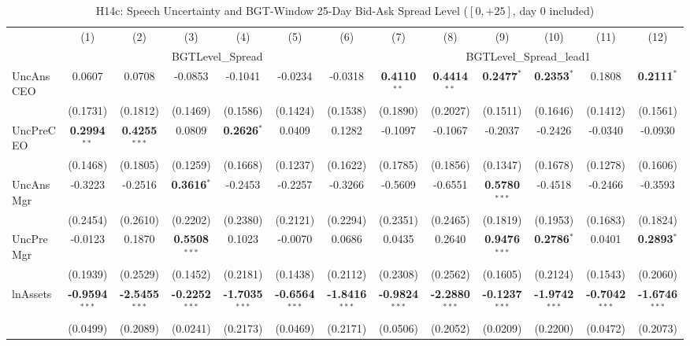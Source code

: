 \documentclass[11pt,a4paper]{article}
\begin{document}
\begin{table}[htbp]
\centering
\caption{H14c: Speech Uncertainty and BGT-Window 25-Day Bid-Ask Spread Level ($[0,+25]$, day 0 included)}
\label{tab:h14c}
\scriptsize
\begin{tabular}{lcccccccccccc}
\toprule
 & (1) & (2) & (3) & (4) & (5) & (6) & (7) & (8) & (9) & (10) & (11) & (12) \\
 & \multicolumn{6}{c}{BGTLevel\_Spread} & \multicolumn{6}{c}{BGTLevel\_Spread\_lead1} \\
\cmidrule(lr){2-7} \cmidrule(lr){8-13}
\midrule
UncAnsCEO & 0.0607 & 0.0708 & -0.0853 & -0.1041 & -0.0234 & -0.0318 & \textbf{0.4110}$^{**}$ & \textbf{0.4414}$^{**}$ & \textbf{0.2477}$^{*}$ & \textbf{0.2353}$^{*}$ & 0.1808 & \textbf{0.2111}$^{*}$ \\
 & (0.1731) & (0.1812) & (0.1469) & (0.1586) & (0.1424) & (0.1538) & (0.1890) & (0.2027) & (0.1511) & (0.1646) & (0.1412) & (0.1561) \\
UncPreCEO & \textbf{0.2994}$^{**}$ & \textbf{0.4255}$^{***}$ & 0.0809 & \textbf{0.2626}$^{*}$ & 0.0409 & 0.1282 & -0.1097 & -0.1067 & -0.2037 & -0.2426 & -0.0340 & -0.0930 \\
 & (0.1468) & (0.1805) & (0.1259) & (0.1668) & (0.1237) & (0.1622) & (0.1785) & (0.1856) & (0.1347) & (0.1678) & (0.1278) & (0.1606) \\
UncAnsMgr & -0.3223 & -0.2516 & \textbf{0.3616}$^{*}$ & -0.2453 & -0.2257 & -0.3266 & -0.5609 & -0.6551 & \textbf{0.5780}$^{***}$ & -0.4518 & -0.2466 & -0.3593 \\
 & (0.2454) & (0.2610) & (0.2202) & (0.2380) & (0.2121) & (0.2294) & (0.2351) & (0.2465) & (0.1819) & (0.1953) & (0.1683) & (0.1824) \\
UncPreMgr & -0.0123 & 0.1870 & \textbf{0.5508}$^{***}$ & 0.1023 & -0.0070 & 0.0686 & 0.0435 & 0.2640 & \textbf{0.9476}$^{***}$ & \textbf{0.2786}$^{*}$ & 0.0401 & \textbf{0.2893}$^{*}$ \\
 & (0.1939) & (0.2529) & (0.1452) & (0.2181) & (0.1438) & (0.2112) & (0.2308) & (0.2562) & (0.1605) & (0.2124) & (0.1543) & (0.2060) \\
\midrule
lnAssets & \textbf{-0.9594}$^{***}$ & \textbf{-2.5455}$^{***}$ & \textbf{-0.2252}$^{***}$ & \textbf{-1.7035}$^{***}$ & \textbf{-0.6564}$^{***}$ & \textbf{-1.8416}$^{***}$ & \textbf{-0.9824}$^{***}$ & \textbf{-2.2880}$^{***}$ & \textbf{-0.1237}$^{***}$ & \textbf{-1.9742}$^{***}$ & \textbf{-0.7042}$^{***}$ & \textbf{-1.6746}$^{***}$ \\
 & (0.0499) & (0.2089) & (0.0241) & (0.2173) & (0.0469) & (0.2171) & (0.0506) & (0.2052) & (0.0209) & (0.2200) & (0.0472) & (0.2073) \\

\end{tabular}
\end{table}
\end{document}
